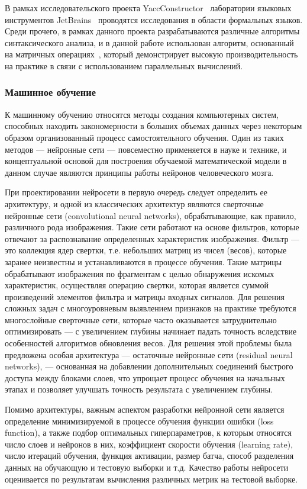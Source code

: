 В рамках исследовательского проекта YaccConstructor~\cite{yacc} лаборатории языковых
инструментов JetBrains~\cite{jetbrains} проводятся исследования в области формальных языков. Среди прочего, в рамках данного проекта разрабатываются различные алгоритмы синтаксического анализа, и в данной работе использован алгоритм, основанный на матричных операциях~\cite{azimov2018context}, который демонстрирует высокую производительность на практике в связи с использованием параллельных вычислений.

\subsubsection{Машинное обучение}
К машинному обучению относятся методы создания компьютерных систем, способных находить закономерности в больших объемах данных через некоторым образом организованный процесс самостоятельного обучения. Один из таких методов --- нейронные сети --- повсеместно применяется в науке и технике, и концептуальной основой для построения обучаемой математической модели в данном случае являются принципы работы нейронов человеческого мозга.

При проектировании нейросети в первую очередь следует определить ее архитектуру, и одной из классических архитектур являются сверточные нейронные сети (convolutional neural networks), обрабатывающие, как правило, различного рода изображения. Такие сети работают на основе фильтров, которые отвечают за распознавание определенных характеристик изображения. Фильтр --- это коллекция ядер свертки, т.е. небольших матриц из чисел (весов), которые заранее неизвестны и устанавливаются в процессе обучения. Такие матрицы обрабатывают изображения по фрагментам с целью обнаружения искомых характеристик, осуществляя операцию свертки, которая является суммой произведений элементов фильтра и матрицы входных сигналов. Для решения сложных задач с многоуровневым выявлением признаков на практике требуются многослойные сверточные сети, которые часто оказывается затруднительно оптимизировать --- с увеличением глубины начинает падать точность вследствие особенностей алгоритмов обновления весов. Для решения этой проблемы была предложена особая архитектура --- остаточные нейронные сети (residual neural networks), --- основанная на добавлении дополнительных соединений быстрого доступа между блоками слоев, что упрощает процесс обучения на начальных этапах и позволяет улучшать точность результата с увеличением глубины. 

Помимо архитектуры, важным аспектом разработки нейронной сети является определение минимизируемой в процессе обучения функции ошибки (loss function), а также подбор оптимальных гиперпараметров, к которым относятся число слоев и нейронов в них, коэффициент скорости обучения (learning rate), число итераций обучения, функция активации, размер батча, способ разделения данных на обучающую и тестовую выборки и т.д. Качество работы нейросети оценивается по результатам вычисления различных метрик на тестовой выборке.

